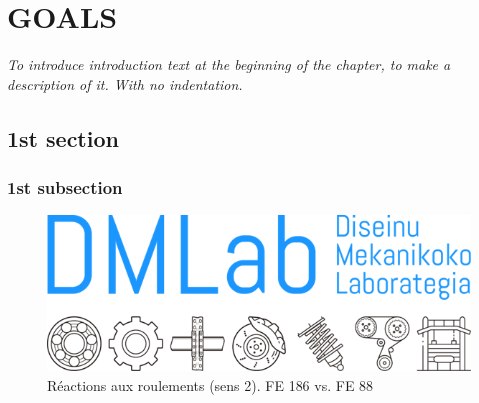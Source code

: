 
\chapter{GOALS} %
\label{Goals}

\vspace*{3\baselineskip} %

\noindent \textit{To introduce introduction text at the beginning of the chapter, to make a description of it. With no indentation.}

\section{1st section}

\blindtext

\subsection{1st subsection}


\begin{figure}[!htb]\centering	
\includegraphics[width=0.69\linewidth]{Figures/Logo_DMLab2.png}
    \caption{Réactions aux roulements (sens 2). FE 186 vs. FE 88}
    \label{reac}
\end{figure} 